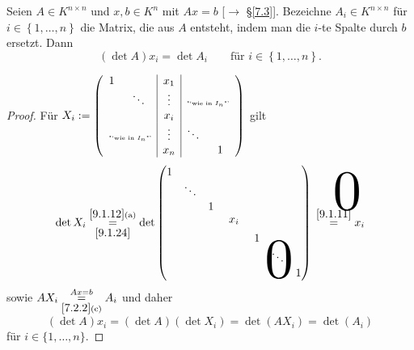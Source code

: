 \documentclass[../../main.tex]{subfiles}
\begin{document}
\begin{sat}\label{9.2.7}
Seien $A\in K^{n\times n}$ und $x,b\in K^n$ mit $Ax = b$ {\rm[$\to$ §\ref{7.3}]}. Bezeichne $A_i\in K^{n\times n}$ für $i\in \left\{1,\ldots,n\right\}$ die Matrix, die aus $A$ entsteht, indem man die $i$-te Spalte durch $b$ ersetzt. Dann
$$(\det A)x_i = \det A_i \qquad\text{für }i\in \left\{1,\ldots,n\right\}.$$
\end{sat}
\begin{proof}
Für $X_i := \left(\begin{array}{cc|c|cc}
1 & & x_1 & \\
 & \ddots & \vdots & \multicolumn{2}{c}{\text{{\tiny"`wie in $I_n$"'}}}\\
 & & x_i & \\
 \multicolumn{2}{c|}{\text{{\tiny"`wie in $I_n$"'}}} & \vdots & \ddots\\
 & & x_n & & 1
\end{array}\right)$ gilt
$$\det X_i \overset{\ref{9.1.12}\text{(a)}}{\underset{\ref{9.1.24}}{=}} \det
\begin{pmatrix}
1\\
&\ddots\\
&&1\\
&&&\tikz\node(P192){$x_i$};\\
&&&&1\\
&&&&&\ddots\\
&&&&&&1
\end{pmatrix}
\begin{tikzpicture}[overlay]
\node[below left of = P192,xshift=-1em,yshift=-1em,scale=5]{$0$};
\node[above right of = P192,xshift=1em,yshift=1em,scale=5]{$0$};
\end{tikzpicture}
 \overset{\ref{9.1.11}}{=}x_i$$
sowie $AX_i \overset{Ax = b}{\underset{\ref{7.2.2}\text{(c)}}{=}} A_i$ und daher
\[(\det A)x_i = (\det A)(\det X_i) = \det(AX_i) = \det(A_i)\]
für $i\in\{1,\ldots,n\}$.
\end{proof}

\end{document}
